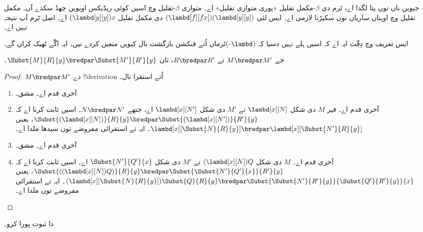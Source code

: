 \documentclass[../../../include/open-logic-section]{subfiles}
\begin{document}
جیویں ناں توں پتا لگدا اے، ٹرم دی $\beta$-مکمل تقلیل
«پوری متوازی تقلیل» اے۔ متوازی $\beta$-تقلیل وچ اسیں
کوئی ریڈیکس اویویں چھڈ سکدے آں۔ مکمل تقلیل وچ اوہناں ساریاں
نوں سکیڑنا لازمی اے۔ ایس لئی $(\lambd[f][fx])(\lambd[y][y])$
دی مکمل تقلیل $(\lambd[y][y])x$ اے۔ اصل ٹرم آپ نتیجہ نہیں اے۔

\begin{editorial}
  ایس تعریف وچ دِقّت ایہ اے کہ اسیں ہلے نہیں دسیا کہ
  ($\lambd$-)ٹرماں اُتے فنکشن بازگشت نال کیویں متعین کردے نیں۔
  ایہ اگّے ٹھیک کراں گے۔
\end{editorial}

\begin{lem}
  جے $M \bredpar M'$ تے $R \bredpar R'$، تاں $\Subst{M}{R}{y}
  \bredpar \Subst{M'}{R'}{y}$۔
\end{lem}

\begin{proof}
  $M \bredpar M'$ دے !!{derivation} اُتے استقرا نال۔
  \begin{enumerate}
    \item آخری قدم  اے۔ مشق۔
    \item آخری قدم  اے۔ فیر $M$ دی شکل
      $\lambd[x][N]$ تے $M'$ دی شکل $\lambd[x][N']$ اے،
      جتھے $N \bredpar N'$۔ اسیں ثابت کرنا اے کہ
      $\Subst{(\lambd[x][N])}{R}{y} \bredpar
      \Subst{(\lambd[x][N'])}{R'}{y}$، یعنی
      $\lambd[x][\Subst{N}{R}{y}] \bredpar
      \lambd[x][\Subst{N'}{R}{y}]$۔ ایہ 
      تے استقرائی مفروضے توں سیدھا ملدا اے۔
    \item آخری قدم  اے۔ مشق۔
    \item آخری قدم  اے۔ $M$ دی شکل
      $(\lambd[x][N])Q$ تے $M'$ دی شکل $\Subst{N'}{Q'}{x}$ اے۔
      اسیں ثابت کرنا اے کہ $\Subst{((\lambd[x][N])Q)}{R}{y} \bredpar
      \Subst{\Subst{N'}{Q'}{x}}{R'}{y}$، یعنی
      $(\lambd[x][\Subst{N}{R}{y}])\Subst{Q}{R}{y} \bredpar
      \Subst{\Subst{N'}{R'}{y}}{\Subst{Q'}{R'}{y}}{x}$۔ ایہ
       تے استقرائی مفروضے توں ملدا اے۔
  \end{enumerate}
\end{proof}

\begin{prob}
   دا ثبوت پورا کرو۔
\end{prob}
\end{document}
